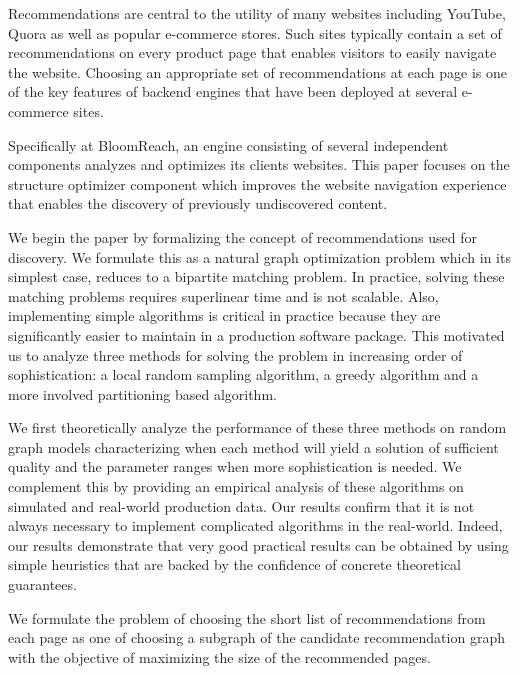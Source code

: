 \abstract

Recommendations are central to the utility of many websites including
YouTube, Quora as well as popular e-commerce stores. Such sites
typically contain a set of recommendations on every product page that 
enables visitors to easily navigate the website. Choosing an
appropriate set of recommendations at each page is one of the key 
features of backend engines that have been deployed at several e-commerce
sites.\vs

Specifically at BloomReach, an engine consisting of several
independent components analyzes and optimizes its clients
websites. This paper focuses on the structure optimizer component
which improves the website navigation experience that enables the
discovery of previously undiscovered content.\vs

We begin the paper by formalizing the concept of recommendations used
for discovery. We formulate this as a natural graph optimization
problem which in its simplest case, reduces to a bipartite matching
problem. In practice, solving these matching problems requires
superlinear time and is not scalable. Also, implementing simple
algorithms is critical in practice because they are significantly
easier to maintain in a production software package. This motivated us
to analyze three methods for solving the problem in increasing order
of sophistication: a local random sampling algorithm, a greedy algorithm
and a more involved partitioning based algorithm. \vs

We first theoretically analyze the performance of these three methods
on random graph models characterizing when each method will yield a
solution of sufficient quality and the parameter ranges when more 
sophistication is needed. We complement this by providing an empirical
analysis of these algorithms on simulated and real-world production
data. Our results confirm that it is not always necessary to implement
complicated algorithms in the real-world. Indeed, our results
demonstrate that very good practical results can be obtained by 
using simple heuristics that are backed by the confidence of concrete
theoretical guarantees. \vs






\iffalse

We formulate the problem of choosing the short list of recommendations from each page as one of choosing a subgraph of the candidate recommendation graph with the objective of maximizing the size of the recommended pages.

